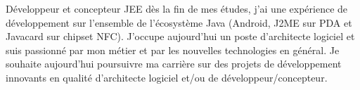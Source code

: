 \par{
Développeur et concepteur JEE dès la fin de mes études, j'ai une expérience de développement sur l'ensemble de l'écosystème Java (Android, J2ME sur PDA et Javacard sur chipset NFC). J'occupe aujourd'hui un poste d'architecte logiciel et suis passionné par mon métier et par les nouvelles technologies en général. Je souhaite aujourd'hui poursuivre ma carrière sur des projets de développement innovants en qualité d'architecte logiciel et/ou de développeur/concepteur.
}